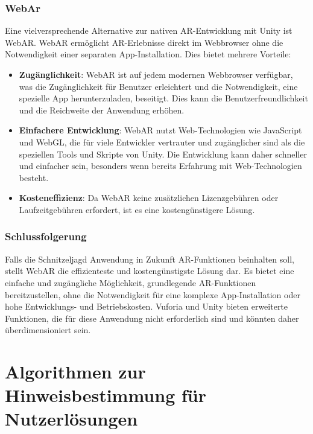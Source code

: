 \subsubsection{WebAr}
Eine vielversprechende Alternative zur nativen AR-Entwicklung mit Unity ist WebAR. WebAR ermöglicht AR-Erlebnisse direkt im Webbrowser ohne die Notwendigkeit einer separaten App-Installation. Dies bietet mehrere Vorteile:
\begin{itemize}
    \item \textbf{Zugänglichkeit}: WebAR ist auf jedem modernen Webbrowser verfügbar, was die Zugänglichkeit für Benutzer erleichtert und die Notwendigkeit, eine spezielle App herunterzuladen, beseitigt. Dies kann die Benutzerfreundlichkeit und die Reichweite der Anwendung erhöhen.

    \item \textbf{Einfachere Entwicklung}: WebAR nutzt Web-Technologien wie JavaScript und WebGL, die für viele Entwickler vertrauter und zugänglicher sind als die speziellen Tools und Skripte von Unity. Die Entwicklung kann daher schneller und einfacher sein, besonders wenn bereits Erfahrung mit Web-Technologien besteht.

    \item \textbf{Kosteneffizienz}: Da WebAR keine zusätzlichen Lizenzgebühren oder Laufzeitgebühren erfordert, ist es eine kostengünstigere Lösung.

\end{itemize}

\subsubsection{Schlussfolgerung}
Falls die Schnitzeljagd Anwendung in Zukunft AR-Funktionen beinhalten soll, stellt WebAR die effizienteste und kostengünstigste Lösung dar. Es bietet eine einfache und zugängliche Möglichkeit, grundlegende AR-Funktionen bereitzustellen, ohne die Notwendigkeit für eine komplexe App-Installation oder hohe Entwicklungs- und Betriebskosten. Vuforia und Unity bieten erweiterte Funktionen, die für diese Anwendung nicht erforderlich sind und könnten daher überdimensioniert sein.



\section{Algorithmen zur Hinweisbestimmung für Nutzerlösungen}

